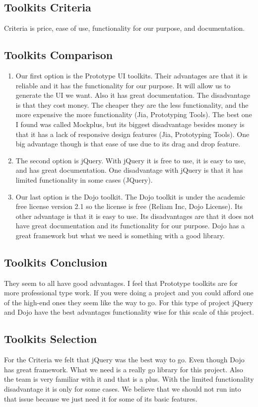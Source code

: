 \documentclass[10pt,draftclsnofoot,onecolumn]{IEEEtran}
\begin{document}
  	\subsection{Toolkits Criteria}
   	Criteria is price, ease of use, functionality for our purpose, and documentation.
   	\subsection{Toolkits Comparison}
   	\begin{enumerate}
   	\item
    	Our first option is the Prototype UI toolkits. 
	Their advantages are that it is reliable and it has the functionality for our purpose. 
	It will allow us to generate the UI we want. Also it has great documentation.
	The disadvantage is that they cost money. 
	The cheaper they are the less functionality, and the more expensive the more functionality (Jia, Prototyping Tools). 
	The best one I found was called Mockplus, but its biggest disadvantage besides money is that it has a lack of responsive design
	features (Jia, Prototyping Tools).
	One big advantage though is that ease of use due to its drag and drop feature.\\
   	\item
    	The second option is jQuery. With jQuery it is free to use, it is easy to use, and has great documentation.
	One disadvantage with jQuery is that it has limited functionality in some cases (JQuery).\\
   	\item
    	Our last option is the Dojo toolkit. 
	The Dojo toolkit is under the academic free license version 2.1 so the license is free (Reliam Inc, Dojo License).
	Its other advantage is that it is easy to use.
	Its disadvantages are that it does not have great documentation and its functionality for our purpose.
	Dojo has a great framework but what we need is something with a good library.
   	\end {enumerate}
    	\subsection{Toolkits Conclusion}
     	They seem to all have good advantages. 
	I feel that Prototype toolkits are for more professional type work.
	If you were doing a project and you could afford one of the high-end ones they seem like the way to go.
	For this type of project jQuery and Dojo have the best advantages functionality wise for this scale of this project.  
     	\subsection{Toolkits Selection}
      	For the Criteria we felt that jQuery was the best way to go. Even though Dojo has great framework.
	What we need is a really go library for this project. Also the team is very familiar with it and that is a plus.
	With the limited functionality disadvantage it is only for some cases.
	We believe that we should not run into that issue because we just need it for some of its basic features.
	
	\printindex



\end{document}
